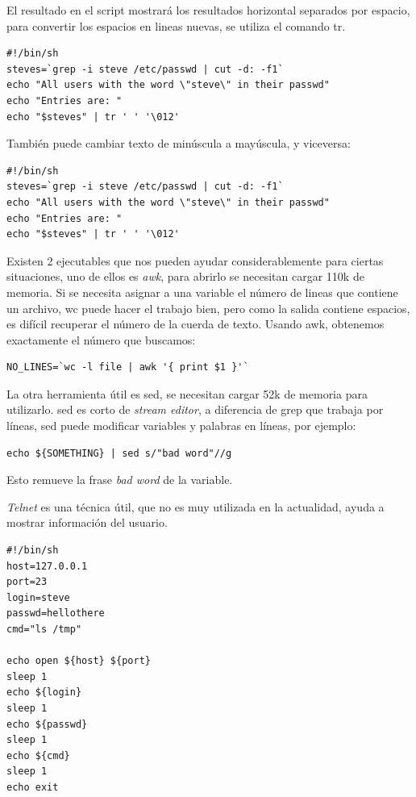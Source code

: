 \documentclass[a4paper]{article}
\begin{document}
El resultado en el script mostrará los resultados horizontal separados por espacio, para convertir los espacios en lineas nuevas, se utiliza el comando tr.

\begin{verbatim}
#!/bin/sh
steves=`grep -i steve /etc/passwd | cut -d: -f1`
echo "All users with the word \"steve\" in their passwd"
echo "Entries are: "
echo "$steves" | tr ' ' '\012'
\end{verbatim}

También puede cambiar texto de minúscula a mayúscula, y viceversa:

\begin{verbatim}
#!/bin/sh
steves=`grep -i steve /etc/passwd | cut -d: -f1`
echo "All users with the word \"steve\" in their passwd"
echo "Entries are: "
echo "$steves" | tr ' ' '\012'
\end{verbatim}

Existen 2 ejecutables que nos pueden ayudar considerablemente para ciertas situaciones, uno de ellos es \textit{awk}, para abrirlo se necesitan cargar 110k de memoria. Si se necesita asignar a una variable el número de lineas que contiene un archivo, wc puede hacer el trabajo bien, pero como la salida contiene espacios, es difícil recuperar el número de la cuerda de texto. Usando awk, obtenemos exactamente el número que buscamos:

\begin{verbatim}
NO_LINES=`wc -l file | awk '{ print $1 }'`
\end{verbatim}

La otra herramienta útil es sed, se necesitan cargar 52k de memoria para utilizarlo. sed es corto de \textit{stream editor}, a diferencia de grep que trabaja por líneas, sed puede modificar variables y palabras en líneas, por ejemplo:

\begin{verbatim}
echo ${SOMETHING} | sed s/"bad word"//g
\end{verbatim}

Esto remueve la frase \textit{bad word} de la variable.

\textit{Telnet} es una técnica útil, que no es muy utilizada en la actualidad, ayuda a mostrar información del usuario.

\begin{verbatim}
#!/bin/sh
host=127.0.0.1
port=23
login=steve
passwd=hellothere
cmd="ls /tmp"

echo open ${host} ${port}
sleep 1
echo ${login}
sleep 1
echo ${passwd}
sleep 1
echo ${cmd}
sleep 1
echo exit
\end{verbatim}
\end{document}
